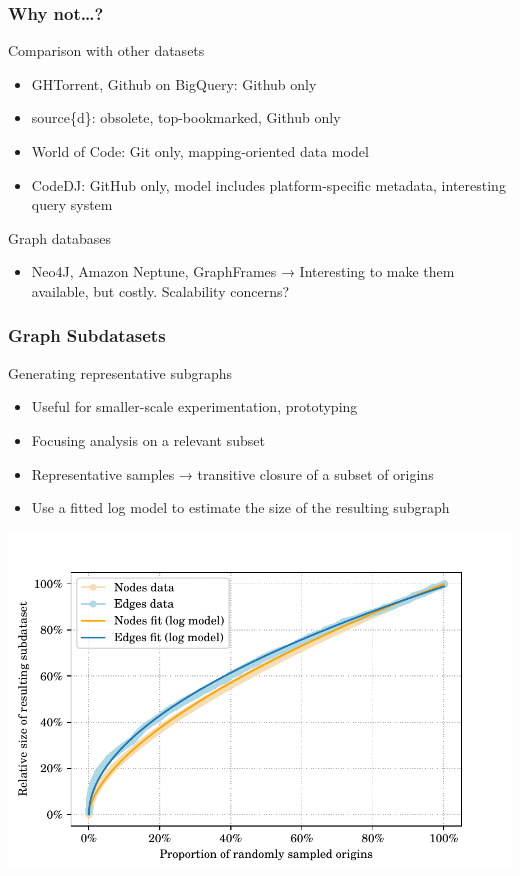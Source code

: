 \documentclass[aspectratio=169,xcolor=table]{beamer}
\begin{document}
    \begin{frame}
        \frametitle{Why not…?}
        \begin{block}{Comparison with other datasets}
            \begin{itemize}
                \item GHTorrent, Github on BigQuery: Github only
                \item source\{d\}: obsolete, top-bookmarked, Github only
                \item World of Code: Git only, mapping-oriented data model
                \item CodeDJ: GitHub only, model includes platform-specific
                    metadata, interesting query system
            \end{itemize}
        \end{block}
        \begin{block}{Graph databases}
            \begin{itemize}
                \item Neo4J, Amazon Neptune, GraphFrames → Interesting to
                    make them available, but costly. Scalability concerns?
            \end{itemize}
        \end{block}
    \end{frame}

    \begin{frame}
        \frametitle{Graph Subdatasets}

        \begin{block}{Generating representative subgraphs}
            \begin{itemize}
                \item Useful for smaller-scale experimentation, prototyping
                \item Focusing analysis on a relevant subset
                \item Representative samples → transitive closure of a subset
                    of origins
                \item Use a fitted log model to estimate the size of the
                    resulting subgraph
            \end{itemize}
        \end{block}

        \begin{center}
            \includegraphics[width=.5\linewidth]{../img/graph-exploitation/subdataset_size_function_fit.pdf}
        \end{center}
    \end{frame}
\end{document}
